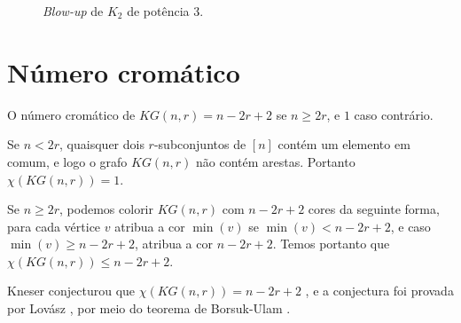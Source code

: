 \begin{figure}[H]
\centering
{}
\caption{\textit{Blow-up} de $K_2$ de potência $3$.}
\label{fig:kneserblowup}
\end{figure}

\section{Número cromático}

\begin{afirmacao}\label{kneseraffchromatic}
O número cromático de $KG(n,r) = n-2r+2$ se $n\geq 2r$, e $1$ caso contrário.
\end{afirmacao}

Se $n < 2r$, quaisquer dois $r$-subconjuntos de $[n]$ contém um elemento em comum, e logo o grafo $KG(n,r)$ não contém arestas. Portanto $\chi(KG(n,r)) = 1$.

Se $n\geq 2r$, podemos colorir $KG(n,r)$ com $n-2r+2$ cores da seguinte forma, para cada vértice $v$ atribua a cor $\min(v)$ se $\min(v) < n-2r+2$, e caso $\min(v) \geq n-2r+2$, atribua a cor $n-2r+2$. Temos portanto que $\chi(KG(n,r)) \leq n-2r+2$.

Kneser conjecturou que $\chi(KG(n,r)) = n-2r+2$ \cite{kneser1955aufgabe}, e a conjectura foi provada por Lovász \cite{lovasz1978kneser}, por meio do teorema de Borsuk-Ulam \cite{borsuk1933drei}.

